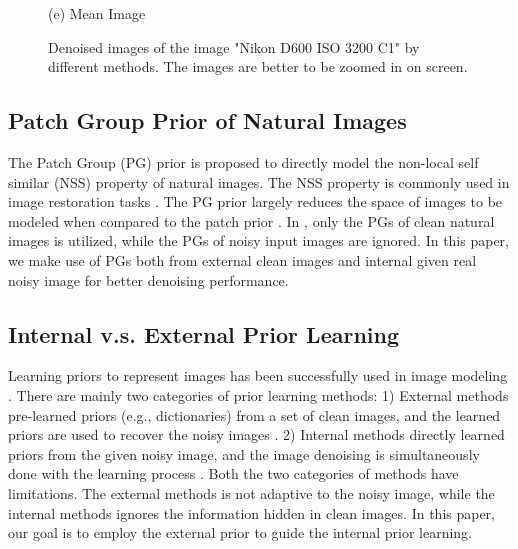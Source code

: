 \documentclass[10pt,twocolumn,letterpaper]{article}
\begin{document}
\begin{figure}
{\begin{minipage}[t]{0.195\textwidth}
{\footnotesize (e) Mean Image \cite{crosschannel2016}}
\end{minipage}
}
\caption{Denoised images of the image "Nikon D600 ISO 3200 C1" by different methods. The images are better to be zoomed in on screen.}
\vspace{-4mm}
\label{fig2}
\end{figure}

\subsection{Patch Group Prior of Natural Images}

The Patch Group (PG) prior \cite{pgpd} is proposed to directly model the non-local self similar (NSS) property of natural images. The NSS property is commonly used in image restoration tasks \cite{nlm,bm3d,lssc,wnnm,pgpd}. The PG prior largely reduces the space of images to be modeled when compared to the patch prior \cite{epll}. In \cite{pgpd}, only the PGs of clean natural images is utilized, while the PGs of noisy input images are ignored. In this paper, we make use of PGs both from external clean images and internal given real noisy image for better denoising performance.


\subsection{Internal v.s. External Prior Learning}

Learning priors to represent images has been successfully used in image modeling \cite{ksvd,epll,pgpd,ple,ncsr}. There are mainly two categories of prior learning methods: 1) External methods pre-learned priors (e.g., dictionaries) from a set of clean images, and the learned priors are used to recover the noisy images \cite{epll,pgpd}. 2) Internal methods directly learned priors from the given noisy image, and the image denoising is simultaneously done with the learning process \cite{ksvd,ple,ncsr}. Both the two categories of methods have limitations. The external methods is not adaptive to the noisy image, while the internal methods ignores the information hidden in clean images. In this paper, our goal is to employ the external prior to guide the internal prior learning.
\end{document}
